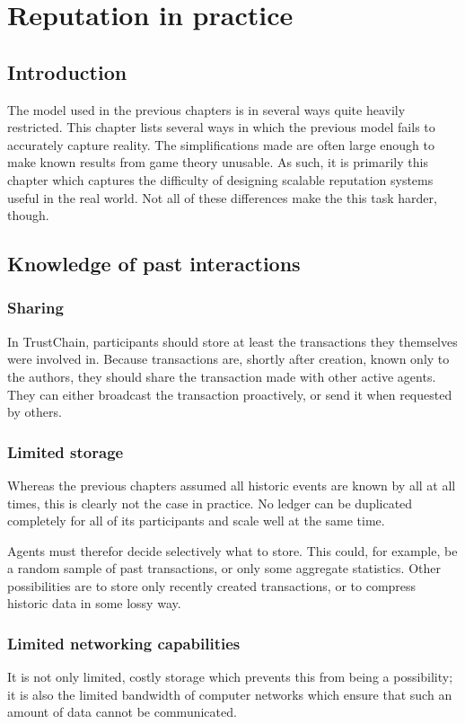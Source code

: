 \chapter{Reputation in practice}
\section{Introduction}
The model used in the previous chapters is in several ways quite heavily restricted. This chapter lists several ways in which the previous model fails to accurately capture reality. The simplifications made are often large enough to make known results from game theory unusable. As such, it is primarily this chapter which captures the difficulty of designing scalable reputation systems useful in the real world. Not all of these differences make the this task harder, though.

\section{Knowledge of past interactions}
\subsection{Sharing}
In TrustChain, participants should store at least the transactions they themselves were involved in. Because transactions are, shortly after creation, known only to the authors, they should share the transaction made with other active agents. They can either broadcast the transaction proactively, or send it when requested by others.

\subsection{Limited storage}
Whereas the previous chapters assumed all historic events are known by all at all times, this is clearly not the case in practice. No ledger can be duplicated completely for all of its participants and scale well at the same time.

Agents must therefor decide selectively what to store. This could, for example, be a random sample of past transactions, or only some aggregate statistics. Other possibilities are to store only recently created transactions, or to compress historic data in some lossy way.

\subsection{Limited networking capabilities}
It is not only limited, costly storage which prevents this from being a possibility; it is also the limited bandwidth of computer networks which ensure that such an amount of data cannot be communicated.


